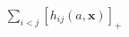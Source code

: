 \documentclass[preview]{standalone}
\begin{document}
\begin{align*}
\sum_{i<j}[h_{ij}(a,\mathbf x)]_+
\end{align*}
\end{document}
